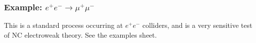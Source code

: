 \documentclass[a4paper,12pt]{article}
\begin{document}
\subsubsection{Example: $e^+ e^- \to \mu^+ \mu^-$}
%
\begin{figure}[!h]
  \centering
  \hfill
\end{figure}
This is a standard process occurring at $e^+ e^-$ colliders, and is a very sensitive test of NC electroweak theory. See the examples sheet.
%
\end{document}

